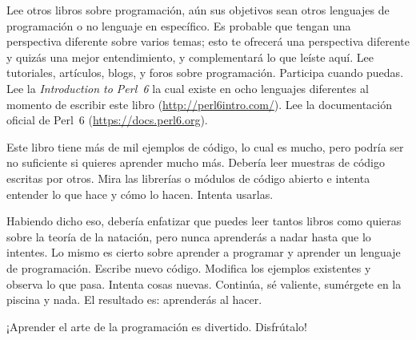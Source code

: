 Lee otros libros sobre programación, aún sus objetivos sean
otros lenguajes de programación o no lenguaje en específico.
Es probable que tengan una perspectiva diferente sobre varios
temas; esto te ofrecerá una perspectiva diferente y quizás una
mejor entendimiento, y complementará lo que leíste aquí.
Lee tutoriales, artículos, blogs, y foros sobre programación.
Participa cuando puedas. Lee la \emph{Introduction to Perl~6}
la cual existe en ocho lenguajes diferentes al momento de
escribir este libro (\url{http://perl6intro.com/}). Lee la
documentación oficial de Perl~6 (\url{https://docs.perl6.org}).

Este libro tiene más de mil ejemplos de código, lo cual es mucho,
pero podría ser no suficiente si quieres aprender mucho más.
Debería leer muestras de código escritas por otros. Mira las 
librerías o módulos de código abierto e intenta entender lo que 
hace y cómo lo hacen. Intenta usarlas.

Habiendo dicho eso, debería enfatizar que puedes leer tantos libros
como quieras sobre la teoría de la natación, pero nunca aprenderás
a nadar hasta que lo intentes. Lo mismo es cierto sobre aprender 
a programar y aprender un lenguaje de programación. Escribe nuevo
código. Modifica los ejemplos existentes y observa lo que pasa. 
Intenta cosas nuevas. Continúa, sé valiente, sumérgete en la piscina
y nada. El resultado es:  aprenderás al hacer.

¡Aprender el arte de la programación es divertido. Disfrútalo!

